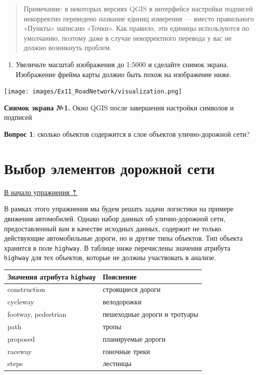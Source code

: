 \documentclass[
  12pt,
]{book}
\providecommand{\tightlist}{%
  \setlength{\itemsep}{0pt}\setlength{\parskip}{0pt}}
\begin{document}
\begin{quote}
Примечание: в некоторых версиях QGIS в интерфейсе настройки подписей некорректно переведено название единиц измерения --- вместо правильного «Пункты» написано «Точки». Как правило, эти единицы используются по умолчанию, поэтому даже в случае некорректного перевода у вас не должно возникнуть проблем.
\end{quote}

\begin{enumerate}
\def\labelenumi{\arabic{enumi}.}
\setcounter{enumi}{6}
\tightlist
\item
  Увеличьте масштаб изображения до 1:5000 и сделайте снимок экрана. Изображение фрейма карты должно быть похож на изображение ниже.
\end{enumerate}

\texttt{[image: images/Ex11\_RoadNetwork/visualization.png]}

\textbf{Снимок экрана №1.} Окно QGIS после завершения настройки символов и подписей

\textbf{Вопрос 1}: сколько объектов содержится в слое объектов улично-дорожной сети?

\hypertarget{networks-query}{%
\section{Выбор элементов дорожной сети}\label{networks-query}}

\protect\hyperlink{networks}{В начало упражнения ⇡}

В рамках этого упражнения мы будем решать задачи логистики на примере движения автомобилей. Однако набор данных об улично-дорожной сети, предоставленный вам в качестве исходных данных, содержит не только действующие автомобильные дороги, но и другие типы объектов. Тип объекта хранится в поле \texttt{highway}. В таблице ниже перечислены значения атрибута \texttt{highway} для тех объектов, которые не должны участвовать в анализе.

\begin{longtable}[]{@{}ll@{}}
\toprule
Значения атрибута \texttt{highway} & Пояснение \\
\midrule
\endhead
construction & строящиеся дороги \\
cycleway & велодорожки \\
footway, pedestrian & пешеходные дороги и тротуары \\
path & тропы \\
proposed & планируемые дороги \\
raceway & гоночные треки \\
steps & лестницы \\
\bottomrule
\end{longtable}
\end{document}
